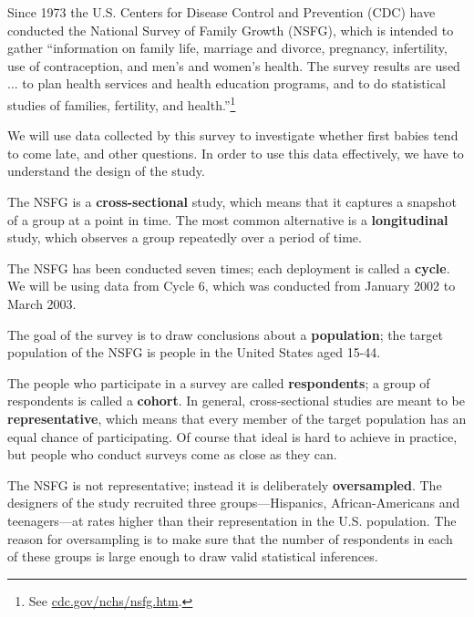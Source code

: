 \documentclass[12pt]{book}
\begin{document}
Since 1973 the U.S. Centers for Disease Control and Prevention (CDC)
have conducted the National Survey of Family Growth (NSFG),
which is intended to gather ``information on family life, marriage and
divorce, pregnancy, infertility, use of contraception, and men's and
women's health. The survey results are used ... to plan health services and
health education programs, and to do statistical studies of families,
fertility, and health.''\footnote{See
  \url{cdc.gov/nchs/nsfg.htm}.}


We will use data collected by this survey to investigate whether first
babies tend to come late, and other questions.  In order to use this
data effectively, we have to understand the design of the study.

The NSFG is a {\bf cross-sectional} study, which means that it
captures a snapshot of a group at a point in time.  The most
common alternative is a {\bf longitudinal} study, which observes a
group repeatedly over a period of time.


The NSFG has been conducted seven times; each deployment is called
a {\bf cycle}.  We will be using data from Cycle 6, which was
conducted from January 2002 to March 2003.


The goal of the survey is to draw conclusions about a
{\bf population}; the target population of the NSFG is people in
the United States aged 15-44.


The people who participate in a survey are called {\bf respondents};
a group of respondents is called a {\bf cohort}.
In general, cross-sectional studies are meant to be {\bf
  representative}, which means that every member of the target
population has an equal chance of participating.  Of course that ideal
is hard to achieve in practice, but people who conduct surveys come as
close as they can.


The NSFG is not representative; instead it is deliberately {\bf
  oversampled}.  The designers of the study recruited three
groups---Hispanics, African-Americans and teenagers---at rates higher
than their representation in the U.S. population.
The reason for oversampling is to make sure that the number of
respondents in each of these groups is large enough to draw valid
statistical inferences.
\end{document}
